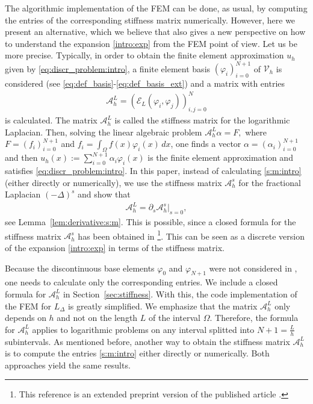 \documentclass[11 pt]{article}
\numberwithin{equation}{section}
\def\cE{\mathcal{E}}
\begin{document}
 The algorithmic implementation of the FEM can be done, as usual, by computing the entries of the corresponding stiffness matrix numerically. However, here we present an alternative, which we believe that also gives a new perspective on how to understand the expansion \eqref{intro:exp} from the FEM point of view. Let us be more precise. Typically, in order to obtain the finite element approximation $u_h$ given by \eqref{eq:discr_problem:intro}, a finite element basis $(\varphi_i)_{i=0}^{N+1}$ of $\mathcal V_h$ is considered (see \eqref{eq:def_basis}-\eqref{eq:def_basis_ext}) and a matrix with entries
 \begin{align}\label{s:m:intro}
 \mathcal A_{h}^{L}=(\cE_L(\varphi_i,\varphi_j))_{i,j=0}^N
 \end{align}
 is calculated.  The matrix $\mathcal A_{h}^{L}$ is called the stiffness matrix for the logarithmic Laplacian.  Then, solving the linear algebraic problem $\mathcal A_{h}^{L}\alpha = F,$  where $F=(f_i)_{i=0}^{N+1}$ and $f_i=\int_{\Omega}f(x)\varphi_i(x)\, dx$, one finds a vector $\alpha=(\alpha_i)_{i=0}^{N+1}$ and then $u_h(x):=\sum_{i=0}^{N+1}\alpha_i \varphi_i(x)$  is the finite element approximation and satisfies \eqref{eq:discr_problem:intro}. In this paper, instead of calculating \eqref{s:m:intro} (either directly or numerically), we use the stiffness matrix $\mathcal A_{h}^{s}$ for the fractional Laplacian $(-\Delta)^s$ and show that
 \begin{align*}
 \mathcal A_{h}^{L}=\partial_s \mathcal A_{h}^{s}|_{s=0},
 \end{align*}
 see Lemma~\ref{lem:derivative:s:m}.  This is possible, since a closed formula for the stiffness matrix $\mathcal A_{h}^{s}$ has been obtained in \cite{BH17}\footnote{This reference is an extended preprint version of the published article \cite{BHS19}.}.  This can be seen as a discrete version of the expansion \eqref{intro:exp} in terms of the stiffness matrix.
 
 Because the discontinuous base elements $\varphi_0$ and $\varphi_{N+1}$ were not considered in \cite{BH17}, one needs to calculate only the corresponding entries.  We include a closed formula for $\mathcal A_{h}^{L}$ in Section~\ref{sec:stiffness}.  With this, the code implementation of the FEM for $L_\Delta$ is greatly simplified. We emphasize that the matrix $\mathcal A_{h}^{L}$ only depends on $h$ and not on the length $L$ of the interval $\Omega$.  Therefore, the formula for $\mathcal A_{h}^{L}$ applies to logarithmic problems on any interval splitted into $N+1=\frac{L}{h}$ subintervals. As mentioned before, another way to obtain the stiffness matrix $\mathcal A_{h}^{L}$ is to compute the entries \eqref{s:m:intro} either directly or numerically. Both approaches yield the same results.
\end{document}
